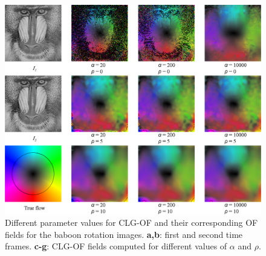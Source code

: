 \documentclass{article}
\begin{document}
\begin{figure}
 \centering
 \includegraphics[width=1.00\textwidth]{./img/ex_baboon_rot.png}
 \caption{Different parameter values for CLG-OF and their corresponding OF fields 
          for the baboon rotation images.
          \textbf{a,b}: first and second time frames. \textbf{c-g}: CLG-OF fields 
          computed for different values of $\alpha$ and $\rho$.}
 \label{fig:ex5}
\end{figure}



\end{document}

